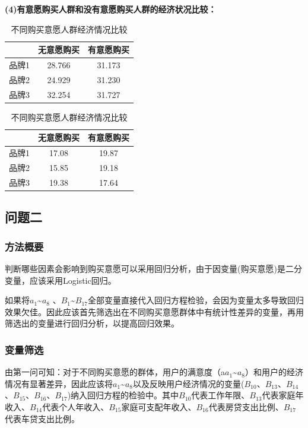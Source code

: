 \documentclass{JXUSTmodeling}
\begin{document}
\textbf{(4)有意愿购买人群和没有意愿购买人群的经济状况比较：}
\begin{table}[!htpb]
	\caption{不同购买意愿人群经济情况比较}
	\begin{minipage}{0.48\linewidth}
		\centering
		\begin{tabular}{ccc}
			\toprule[1.5pt]
			&无意愿购买&有意愿购买\\
			\midrule
			品牌1&28.766&31.173\\
			品牌2&24.929&31.230\\
			品牌3&32.254&31.727\\
			\bottomrule[1.5pt]
		\end{tabular} 
	\end{minipage}
\begin{minipage}{0.48\linewidth}  
		\centering
		\begin{tabular}{ccc}
			\toprule[1.5pt]
			&无意愿购买&有意愿购买\\
			\midrule
			品牌1&17.08&19.87\\
			品牌2&15.85&19.18\\
			品牌3&19.38&17.64\\
			\bottomrule[1.5pt]
		\end{tabular} 
	\end{minipage}
\end{table}
\subsection{问题二}\label{sub:5.2}
\subsubsection{方法概要}
判断哪些因素会影响到购买意愿可以采用回归分析，由于因变量(购买意愿)是二分变量，应该采用Logistic回归。

如果将$ a_{1} $\~{}$ a_{8}$ 、$ B_{1} $\~{}$ B_{17}$全部变量直接代入回归方程检验，会因为变量太多导致回归效果欠佳。因此应该首先筛选出在不同购买意愿群体中有统计性差异的变量，再用筛选出的变量进行回归分析，以提高回归效果。

\subsubsection{变量筛选}
由第一问可知：对于不同购买意愿的群体，用户的满意度（a$ a_{1} $\~{}$ a_{8}$）和用户的经济情况有显著差异，因此应该将$ a_{1} $\~{}$ a_{8}$以及反映用户经济情况的变量($ B_{10} $、$ B_{13} $、$ B_{14} $、$ B_{15} $、$ B_{16} $、$ B_{17} $)纳入回归方程的检验中。其中$ B_{10} $代表工作年限、$ B_{13} $代表家庭年收入、$ B_{14} $代表个人年收入、$ B_{15} $家庭可支配年收入、$ B_{16} $代表房贷支出比例、$ B_{17} $代表车贷支出比例。
\end{document}
